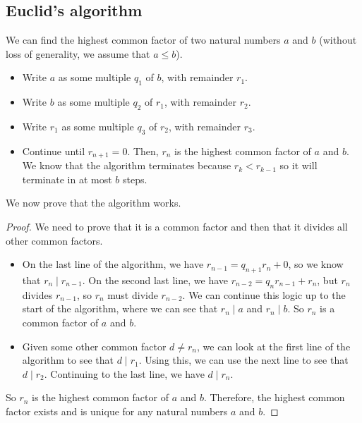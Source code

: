 \subsection{Euclid's algorithm}
We can find the highest common factor of two natural numbers \(a\) and \(b\) (without loss of generality, we assume that \(a \leq b\)).
\begin{itemize}
	\item Write \(a\) as some multiple \(q_1\) of \(b\), with remainder \(r_1\).
	\item Write \(b\) as some multiple \(q_2\) of \(r_1\), with remainder \(r_2\).
	\item Write \(r_1\) as some multiple \(q_3\) of \(r_2\), with remainder \(r_3\).
	\item Continue until \(r_{n+1}=0\).
	      Then, \(r_n\) is the highest common factor of \(a\) and \(b\).
	      We know that the algorithm terminates because \(r_k < r_{k-1}\) so it will terminate in at most \(b\) steps.
\end{itemize}
We now prove that the algorithm works.
\begin{proof}
	We need to prove that it is a common factor and then that it divides all other common factors.
	\begin{itemize}
		\item On the last line of the algorithm, we have \(r_{n-1} = q_{n+1} r_n + 0\), so we know that \(r_n \mid r_{n-1}\).
		      On the second last line, we have \(r_{n-2} = q_n r_{n-1} + r_n\), but \(r_n\) divides \(r_{n-1}\), so \(r_n\) must divide \(r_{n-2}\).
		      We can continue this logic up to the start of the algorithm, where we can see that \(r_n \mid a\) and \(r_n \mid b\).
		      So \(r_n\) is a common factor of \(a\) and \(b\).
		\item Given some other common factor \(d \neq r_n\), we can look at the first line of the algorithm to see that \(d \mid r_1\).
		      Using this, we can use the next line to see that \(d \mid r_2\).
		      Continuing to the last line, we have \(d \mid r_n\).
	\end{itemize}
	So \(r_n\) is the highest common factor of \(a\) and \(b\).
	Therefore, the highest common factor exists and is unique for any natural numbers \(a\) and \(b\).
\end{proof}

